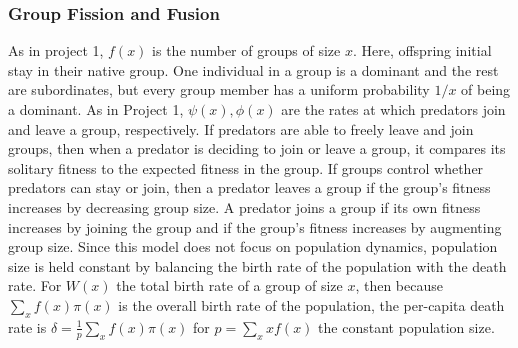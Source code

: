 \subsubsection{Group Fission and Fusion}
As in project 1, $f(x)$ is the number of groups of size $x$. Here, offspring initial stay in their native group. One individual in a group is a dominant and the rest are subordinates, but every group member has a uniform probability $1/x$ of being a dominant. As in Project 1, $\psi(x), \phi(x)$ are the rates at which predators join and leave a group, respectively. If predators are able to freely leave and join groups, then when a predator is deciding to join or leave a group, it compares its solitary fitness to the expected fitness in the group. If groups control whether predators can stay or join, then a predator leaves a group if the group's fitness increases by decreasing group size. A predator joins a group if its own fitness increases by joining the group and if the group's fitness increases by augmenting group size. Since this model does not focus on population dynamics, population size is held constant by balancing the birth rate of the population with the death rate. For $W(x)$ the total birth rate of a group of size $x$, then because $\sum_x f(x) \pi(x)$ is the overall birth rate of the population, the per-capita death rate is $\delta = \frac{1}{p} \sum_x f(x) \pi(x)$ for $p = \sum_x x f(x)$ the constant population size.


